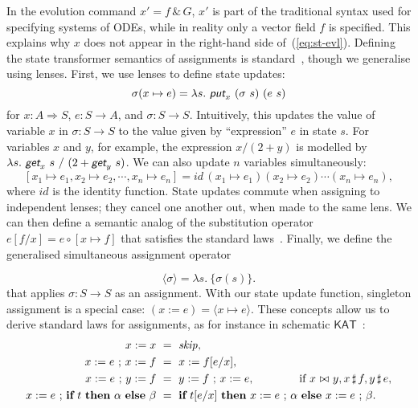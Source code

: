 \documentclass[envcountsame,envcountsect]{llncs}
\newcommand{\sskip}{\mathit{skip}}
\newcommand{\KAT}{\mathsf{KAT}}
\newcommand{\lput}{\textit{\textsf{put}}}
\newcommand{\lget}{\textit{\textsf{get}}}
\newcommand{\lto}{\Longrightarrow}
\newcommand{\lindep}{\mathop{\,\bowtie\,}}
\newcommand{\unrest}{\mathop{\sharp}}
\newcommand{\seq}{\mathop{\,;\,}}
\begin{document}
In the evolution command $x'= f\, \&\, G$, $x'$ is part of the
traditional syntax used for specifying systems of ODEs, while in
reality only a vector field $f$ is specified. This explains why $x$
does not appear in the right-hand side of~(\ref{eq:st-evl}). Defining
the state transformer semantics of assignments is
standard~\cite{MuniveS19}, though we generalise using lenses. First,
we use lenses to define state updates:
$$\sigma(x\mapsto e) = \lambda s.\ \lput_x ~ (\sigma~s) ~ (e~s)$$
for $x : A \lto S$, $e : S \to A$, and $\sigma : S \to S$.
Intuitively, this updates the value of variable $x$ in
$\sigma : S \to S$ to the value given by ``expression'' $e$ in state
$s$. For variables $x$ and $y$, for example, the expression
$x / (2 + y)$ is modelled by
$\lambda s. \ \lget_x~s ~/~ (2 + \lget_y~s)$. We can also update $n$
variables simultaneously:
$$[x_1 \mapsto e_1, x_2 \mapsto e_2, \cdots, x_n \mapsto e_n] =
\textit{id}\, (x_1 \mapsto e_1)(x_2 \mapsto e_2)\cdots(x_n \mapsto
e_n),$$
where $\textit{id}$ is the identity function. State updates commute
when assigning to independent lenses; they cancel one another out,
when made to the same lens. We can then define a semantic analog of
the substitution operator $e[f/x] = e\circ[x \mapsto f]$ that
satisfies the standard laws~\cite{FosterZW16}. Finally, we
define the generalised simultaneous assignment operator

\begin{equation}
  \langle \sigma \rangle = \lambda s.\ \{ \sigma(s) \}.\tag{st-assgn}
\end{equation}
%
that applies $\sigma : S \to S$ as an assignment. With our state
update function, singleton assignment is a special case:
$(x := e) =\langle x \mapsto e \rangle$. These concepts allow us to
derive standard laws for assignments, as for instance in schematic
$\KAT$~\cite{AngusK01}:
%
\begin{align*}
  x := x &~=~ \sskip, \\
  x := e \seq x := f &~=~ x := f[e/x], \\
  x := e \seq y := f &~=~ y := f \seq x := e, \qquad\qquad
                       \textnormal{if~} x \lindep y, x \unrest f, y
                       \unrest e, \\
  x := e \seq \textbf{if}~ t ~ \textbf{then}~ \alpha ~ \textbf{else}~ \beta 
                          &~=~ \textbf{if}~ t[e/x]  ~\textbf{then}~ x := e \seq \alpha  ~\textbf{else}~ x := e \seq \beta.
\end{align*}
\end{document}
